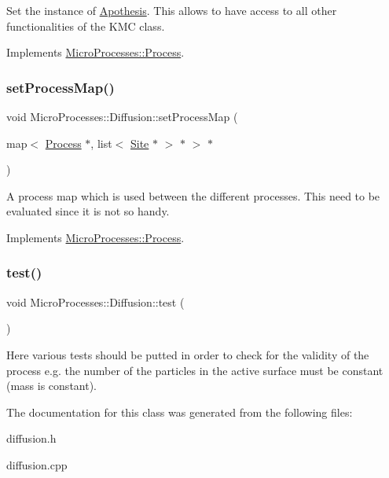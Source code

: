 Set the instance of \mbox{\hyperlink{classApothesis}{Apothesis}}. This allows to have access to all other functionalities of the K\+MC class. 

Implements \mbox{\hyperlink{classMicroProcesses_1_1Process_a4c419af2e6e6477200b45bf687783c84}{Micro\+Processes\+::\+Process}}.

\mbox{\label{classMicroProcesses_1_1Diffusion_a53e5d56710045b4f8783d9c05591357f}} 
\subsubsection{\texorpdfstring{set\+Process\+Map()}{setProcessMap()}}
{\footnotesize\ttfamily void Micro\+Processes\+::\+Diffusion\+::set\+Process\+Map (\begin{DoxyParamCaption}\item[{map$<$ \mbox{\hyperlink{classMicroProcesses_1_1Process}{Process}} $\ast$, list$<$ \mbox{\hyperlink{classSurfaceTiles_1_1Site}{Site}} $\ast$ $>$ $\ast$ $>$ $\ast$}]{ }\end{DoxyParamCaption})\hspace{0.3cm}{\ttfamily [virtual]}}

A process map which is used between the different processes. This need to be evaluated since it is not so handy. 

Implements \mbox{\hyperlink{classMicroProcesses_1_1Process_a4e726f7491eb805efd9dcd1c0c3a380f}{Micro\+Processes\+::\+Process}}.

\mbox{\label{classMicroProcesses_1_1Diffusion_a281afcddb42b87ae9ba3b48a54524cd1}} 
\subsubsection{\texorpdfstring{test()}{test()}}
{\footnotesize\ttfamily void Micro\+Processes\+::\+Diffusion\+::test (\begin{DoxyParamCaption}{ }\end{DoxyParamCaption})}

Here various tests should be putted in order to check for the validity of the process e.\+g. the number of the particles in the active surface must be constant (mass is constant). 

The documentation for this class was generated from the following files\+:\begin{DoxyCompactItemize}
\item 
diffusion.\+h\item 
diffusion.\+cpp\end{DoxyCompactItemize}
